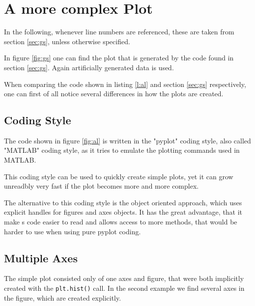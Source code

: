\documentclass[a4paper, 11pt, twocolumn]{article}
\newcommand{\pl}[1]{\mbox{\texttt{#1}\xspace}}
\begin{document}
\section{A more complex Plot}

\label{sec:plt}

\begin{figure*}[ht!]
\centering

\caption{Complex plot example showing different plot types and ways to
         structure the appearance. It is discussed in detail in section
         \ref{sec:plt}.}
\label{fig:gs}
\end{figure*}

In the following, whenever line numbers are referenced, these are taken from
section \ref{sec:gs}, unless otherwise specified.

In figure \ref{fig:gs} one can find the plot that is generated by the code
found in section \ref{sec:gs}. Again artificially generated data is used.

When comparing the code shown in listing \ref{l:al} and section \ref{sec:gs}
respectively, one can first of all notice several differences in how the plots
are created.

\subsection{Coding Style}
The code shown in figure \ref{fig:al} is written in the "pyplot" coding style,
also called "MATLAB" coding style, as it tries to emulate the plotting commands
used in MATLAB.

This coding style can be used to quickly create simple plots, yet it can
grow unreadbly very fast if the plot becomes more and more complex.

The alternative to this coding style is the object oriented approach, which 
uses explicit handles for figures and axes objects. It has the great advantage,
that it make s code easier to read and allows access to more methods, that 
would be harder to use when using pure pyplot coding.


\subsection{Multiple Axes}

The simple plot consisted only of one axes and figure, that were both
implicitly created with the \pl{plt.hist()} call. In the second example we find
several axes in the figure, which are created explicitly.
\end{document}
